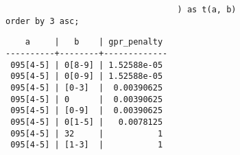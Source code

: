 \documentclass{beamer}
\begin{document}
\begin{frame}[fragile]
\begin{example}
\begin{overprint}
\begin{verbatim}
                                   ) as t(a, b)
order by 3 asc;
  \end{verbatim}

  \begin{verbatim}
    a     |   b    | gpr_penalty
----------+--------+-------------
 095[4-5] | 0[8-9] | 1.52588e-05
 095[4-5] | 0[0-9] | 1.52588e-05
 095[4-5] | [0-3]  |  0.00390625
 095[4-5] | 0      |  0.00390625
 095[4-5] | [0-9]  |  0.00390625
 095[4-5] | 0[1-5] |   0.0078125
 095[4-5] | 32     |           1
 095[4-5] | [1-3]  |           1
  \end{verbatim}

  \end{overprint}
  \end{example}

\end{frame}
\end{document}
